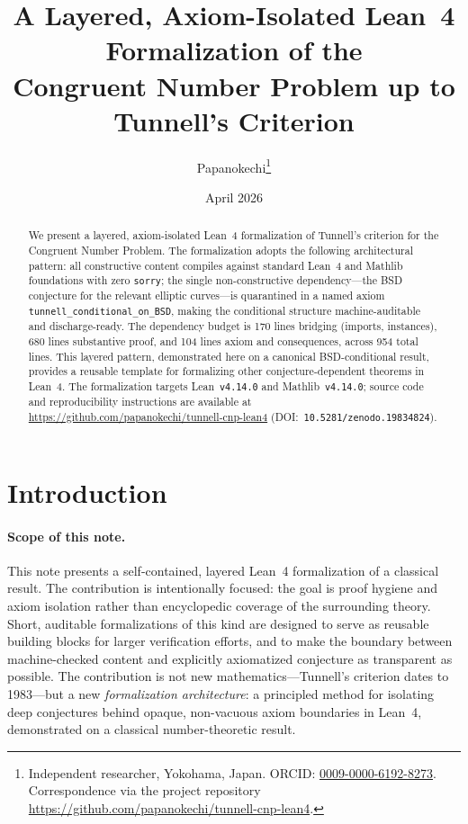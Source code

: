 \documentclass[11pt,a4paper]{article}
\title{%
  A Layered, Axiom-Isolated Lean~4 Formalization of the \\
  Congruent Number Problem up to Tunnell's Criterion%
}
\author{%
  Papanokechi\thanks{Independent researcher, Yokohama, Japan.
  ORCID: \href{https://orcid.org/0009-0000-6192-8273}{0009-0000-6192-8273}.
  Correspondence via the project repository
  \url{https://github.com/papanokechi/tunnell-cnp-lean4}.}%
}
\date{April 2026}
\theoremstyle{definition}
\begin{document}
\maketitle

\begin{abstract}
We present a layered, axiom-isolated Lean~4 formalization of
Tunnell's criterion for the Congruent Number Problem.  The
formalization adopts the following architectural pattern: all
constructive content compiles against standard Lean~4 and Mathlib
foundations with zero \texttt{sorry}; the single non-constructive
dependency---the BSD conjecture for the relevant elliptic
curves---is quarantined in a named axiom
\texttt{tunnell\_conditional\_on\_BSD}, making the conditional
structure machine-auditable and discharge-ready.  The dependency
budget is 170 lines bridging (imports, instances), 680 lines
substantive proof, and 104 lines axiom and consequences, across
954 total lines.  This layered pattern, demonstrated here on a
canonical BSD-conditional result, provides a reusable template
for formalizing other conjecture-dependent theorems in Lean~4.
The formalization targets Lean~\texttt{v4.14.0} and
Mathlib~\texttt{v4.14.0}; source code and reproducibility
instructions are available at
\url{https://github.com/papanokechi/tunnell-cnp-lean4}
(DOI:~\texttt{10.5281/zenodo.19834824}).
\end{abstract}

\section{Introduction}\label{sec:intro}

\paragraph{Scope of this note.}
This note presents a self-contained, layered Lean~4 formalization of
a classical result.  The contribution is intentionally focused: the
goal is proof hygiene and axiom isolation rather than encyclopedic
coverage of the surrounding theory.  Short, auditable formalizations
of this kind are designed to serve as reusable building blocks for
larger verification efforts, and to make the boundary between
machine-checked content and explicitly axiomatized conjecture as
transparent as possible.  The contribution is not new
mathematics---Tunnell's criterion dates to 1983---but a new
\emph{formalization architecture}: a principled method for isolating
deep conjectures behind opaque, non-vacuous axiom boundaries in
Lean~4, demonstrated on a classical number-theoretic result.
\end{document}
